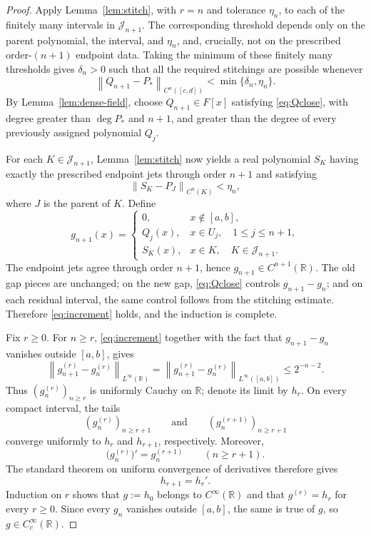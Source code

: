 \documentclass[10pt,a4paper]{amsart}
\newcommand{\R}{\mathbb R}
\newcommand{\norm}[1]{\left\lVert #1\right\rVert}
\begin{document}
\begin{proof}
Apply Lemma~\ref{lem:stitch}, with $r=n$ and tolerance $\eta_n$, to each
of the finitely many intervals in $\mathcal J_{n+1}$. The corresponding
threshold depends only on the parent polynomial, the interval, and
$\eta_n$, and, crucially, not on the prescribed order-$(n+1)$ endpoint
data. Taking the minimum of these finitely many thresholds gives
$\delta_n>0$ such that all the required stitchings are possible whenever
\begin{equation}\label{eq:Qclose}
\norm{Q_{n+1}-P_*}_{C^n([c,d])}
<\min\{\delta_n,\eta_n\}.
\end{equation}
By Lemma~\ref{lem:dense-field}, choose $Q_{n+1}\in F[x]$ satisfying
\eqref{eq:Qclose}, with degree greater than $\deg P_*$ and $n+1$, and greater than the degree of every previously assigned polynomial $Q_j$.

For each $K\in\mathcal J_{n+1}$, Lemma~\ref{lem:stitch} now yields a real
polynomial $S_K$ having exactly the prescribed endpoint jets through order
$n+1$ and satisfying
\[
\norm{S_K-P_J}_{C^n(K)}<\eta_n,
\]
where $J$ is the parent of $K$. Define
\[
g_{n+1}(x)=
\begin{cases}
0, & x\notin[a,b],\\
Q_j(x), & x\in U_j,\quad 1\leq j\leq n+1,\\
S_K(x), & x\in K,\quad K\in\mathcal J_{n+1}.
\end{cases}
\]
The endpoint jets agree through order $n+1$, hence
$g_{n+1}\in C^{n+1}(\R)$. The old gap pieces are unchanged; on the new
gap, \eqref{eq:Qclose} controls $g_{n+1}-g_n$; and on each residual
interval, the same control follows from the stitching estimate. Therefore
\eqref{eq:increment} holds, and the induction is complete.



Fix $r\geq0$. For $n\geq r$, \eqref{eq:increment} together with the fact that $g_{n+1}-g_n$ vanishes outside $[a,b]$, gives
\[
\norm{g_{n+1}^{(r)}-g_n^{(r)}}_{L^\infty(\R)}=\norm{g_{n+1}^{(r)}-g_n^{(r)}}_{L^\infty([a,b])}
\leq2^{-n-2}.
\]
Thus $(g_n^{(r)})_{n\ge r}$ is uniformly Cauchy on $\mathbb R$; denote its limit by $h_r$. On every compact interval, the tails
\[
(g_n^{(r)})_{n\ge r+1}
\qquad\text{and}\qquad
(g_n^{(r+1)})_{n\ge r+1}
\]
converge uniformly to $h_r$ and $h_{r+1}$, respectively. Moreover,
\[
\bigl(g_n^{(r)}\bigr)'=g_n^{(r+1)}
\qquad (n\ge r+1).
\]
The standard theorem on uniform convergence of derivatives therefore gives
\[
h_{r+1}=h_r'.
\]
Induction on $r$ shows that $g:=h_0$ belongs to $C^\infty(\R)$ and that
$g^{(r)}=h_r$ for every $r\geq0$. Since every $g_n$ vanishes outside
$[a,b]$, the same is true of $g$, so $g\in C_c^\infty(\R)$.


\end{proof}
\end{document}
